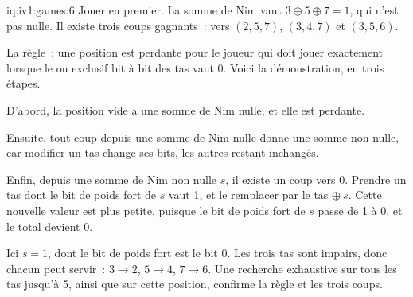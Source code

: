 \begin{solution}{iq:iv1:games:6}
Jouer en premier. La somme de Nim vaut $3 \oplus 5 \oplus 7 = 1$, qui n'est pas nulle. Il existe trois coups gagnants~: vers $(2, 5, 7)$, $(3, 4, 7)$ et $(3, 5, 6)$.

La règle~: une position est perdante pour le joueur qui doit jouer exactement lorsque le ou exclusif bit à bit des tas vaut 0. Voici la démonstration, en trois étapes.

D'abord, la position vide a une somme de Nim nulle, et elle est perdante.

Ensuite, tout coup depuis une somme de Nim nulle donne une somme non nulle, car modifier un tas change ses bits, les autres restant inchangés.

Enfin, depuis une somme de Nim non nulle $s$, il existe un coup vers 0. Prendre un tas dont le bit de poids fort de $s$ vaut 1, et le remplacer par le tas $\oplus\ s$. Cette nouvelle valeur est plus petite, puisque le bit de poids fort de $s$ passe de 1 à 0, et le total devient 0.

Ici $s = 1$, dont le bit de poids fort est le bit 0. Les trois tas sont impairs, donc chacun peut servir~: $3 \to 2$, $5 \to 4$, $7 \to 6$. Une recherche exhaustive sur tous les tas jusqu'à 5, ainsi que sur cette position, confirme la règle et les trois coups.

\end{solution}

